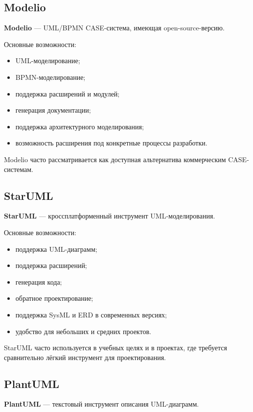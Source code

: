 \documentclass[12pt,a4paper]{article}
\begin{document}
\subsection{Modelio}

\textbf{Modelio} --- UML/BPMN CASE-система, имеющая open-source-версию.

Основные возможности:
\begin{itemize}
    \item UML-моделирование;
    \item BPMN-моделирование;
    \item поддержка расширений и модулей;
    \item генерация документации;
    \item поддержка архитектурного моделирования;
    \item возможность расширения под конкретные процессы разработки.
\end{itemize}

Modelio часто рассматривается как доступная альтернатива коммерческим CASE-системам.

\subsection{StarUML}

\textbf{StarUML} --- кроссплатформенный инструмент UML-моделирования.

Основные возможности:
\begin{itemize}
    \item поддержка UML-диаграмм;
    \item поддержка расширений;
    \item генерация кода;
    \item обратное проектирование;
    \item поддержка SysML и ERD в современных версиях;
    \item удобство для небольших и средних проектов.
\end{itemize}

StarUML часто используется в учебных целях и в проектах, где требуется сравнительно лёгкий инструмент для проектирования.

\subsection{PlantUML}

\textbf{PlantUML} --- текстовый инструмент описания UML-диаграмм.
\end{document}
